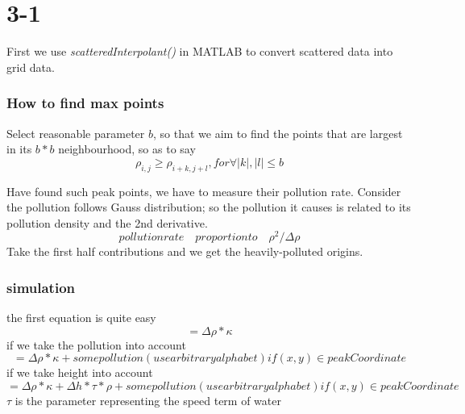 \documentclass[a4paper]{article}
\begin{document}
\part{3-1}
First we use \emph{scatteredInterpolant()} in MATLAB to convert scattered data into grid data.
\section{How to find max points}
Select reasonable parameter $b$, so that we aim to find the points that are largest in its $b*b$ neighbourhood, so as to say
$$ \rho_{i, j} \ge \rho_{i+k, j+l}, for \forall |k|, |l| \le b$$

Have found such peak points, we have to measure their pollution rate. 
Consider the pollution follows Gauss distribution; so the pollution it causes is related to its pollution density and the 2nd derivative.
$$ pollution rate \quad proportion to \quad \rho^2 / \Delta \rho $$
Take the first half contributions and we get the heavily-polluted origins.

\section{simulation}
the first equation is quite easy
$$ = \Delta \rho * \kappa $$
if we take the pollution into account
$$ = \Delta \rho * \kappa + some pollution (use arbitrary alphabet) if (x, y) \in peakCoordinate $$
if we take height into account
$$ = \Delta \rho * \kappa + \Delta h * \tau * \rho + some pollution (use arbitrary alphabet) if (x, y) \in peakCoordinate $$
$\tau$ is the parameter representing the speed term of water
\end{document}
